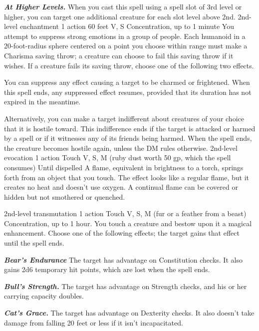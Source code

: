 \documentclass[10pt,twoside,twocolumn,openany]{book}
\newcommand\impact[1]{
	\textbf{\textit{#1}}
}
\begin{document}
\impact{At Higher Levels.} When you cast this spell using a spell slot of 3rd level or higher, you can target one additional creature for each slot level above 2nd.
\newpage
{}
{2nd-level enchantment}
{\color{action}1 action}
{60 feet}
{V, S}
{{\color{concentration}Concentration}, up to 1 minute}
%
You attempt to suppress strong emotions in a group of people. Each humanoid in a 20-foot-radius sphere centered on a point you choose within range must make a Charisma saving throw; a creature can choose to fail this saving throw if it wishes. If a creature fails its saving throw, choose one of the following two effects.

You can suppress any effect causing a target to be charmed or frightened. When this spell ends, any suppressed effect resumes, provided that its duration has not expired in the meantime.

Alternatively, you can make a target indifferent about creatures of your choice that it is hostile toward. This indifference ends if the target is attacked or harmed by a spell or if it witnesses any of its friends being harmed. When the spell ends, the creature becomes hostile again, unless the DM rules otherwise.
\newpage
{}
{2nd-level evocation}
{\color{action}1 action}
{Touch}
{V, S, M (ruby dust worth {\color{cost}50 gp}, which the spell consumes)}
{Until dispelled}
%
A flame, equivalent in brightness to a torch, springs forth from an object that you touch. The effect looks like a regular flame, but it creates no heat and doesn't use oxygen. A continual flame can be covered or hidden but not smothered or quenched.

{2nd-level transmutation}
{\color{action}1 action}
{Touch}
{V, S, M (fur or a feather from a beast)}
{{\color{concentration}Concentration}, up to 1 hour.}
%
You touch a creature and bestow upon it a magical enhancement. Choose one of the following effects; the target gains that effect until the spell ends.

\impact{Bear's Endurance} The target has advantage on Constitution checks. It also gains 2d6 temporary hit points, which are lost when the spell ends.

\impact{Bull's Strength.} The target has advantage on Strength checks, and his or her carrying capacity doubles.

\impact{Cat's Grace.} The target has advantage on Dexterity checks. It also doesn't take damage from falling 20 feet or less if it isn't incapacitated.
\end{document}
